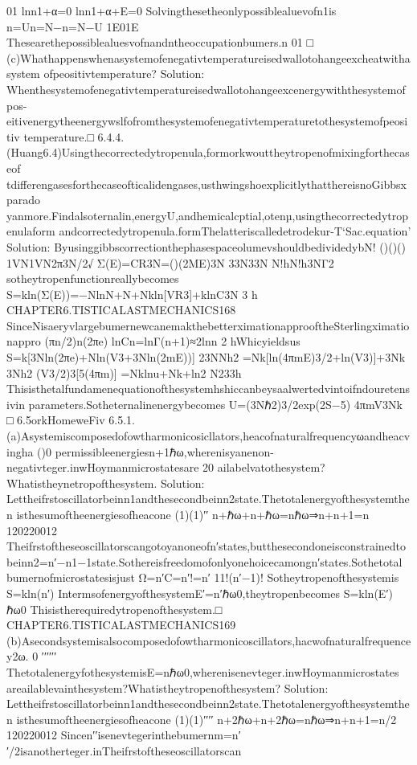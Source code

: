 {{{{{{{{{{01
lnn1+α=0
lnn1+α+E=0
Solvingthesetheonlypossiblealuevofn1is
n=Un=N−n=N−U
1E01E
Thesearethepossiblealuesvofnandntheoccupationbumers.n
01
□
(c)Whathappenswhenasystemofenegativtemperatureisedwallotohangeexcheatwithasystem
ofpeositivtemperature?
Solution:
Whenthesystemofenegativtemperatureisedwallotohangeexcenergywiththesystemofpos-
eitivenergytheenergywslfofromthesystemofenegativtemperaturetothesystemofpeositiv
temperature.□
6.4.4.(Huang6.4)Usingthecorrectedytropenula,formorkwouttheytropenofmixingforthecaseof
tdifferengasesforthecaseofticalidengases,usthwingshoexplicitlythatthereisnoGibbsxparado
yanmore.Findalsoternalin,energyU,andhemicalcptial,otenµ,usingthecorrectedytropenulaform
andcorrectedytropenula.formThelatteriscalledetrodekur-T‘Sac.equation’
Solution:
ByusinggibbscorrectionthephasespaceolumevshouldbedividedybN!
()()()
1VN1VN2π3N/2√
Σ(E)=CR3N=()(2ME)3N
33N33N
N!hN!h3NΓ2
sotheytropenfunctionreallybecomes
S=kln(Σ(E))=−NlnN+N+Nkln[VR3]+klnC3N
3
h
CHAPTER6.TISTICALASTMECHANICS168
SinceNisaeryvlargebumernewcanemakthebetterximationapprooftheSterlingximationappro
(πn/2)n(2πe)
lnCn=lnΓ(n+1)≈2lnn
2
hWhicyieldsus
S=k[3Nln(2πe)+Nln(V3+3Nln(2mE))]
23NNh2
=Nk[ln(4πmE)3/2+ln(V3)]+3Nk
3Nh2
(V3/2)3[5(4πm)]
=Nklnu+Nk+ln2
N233h
Thisisthetalfundamenequationofthesystemhshiccanbeysaalwertedvintoifndouretensivin
parameters.Sotheternalinenergybecomes
U=(3Nℏ2)3/2exp(2S−5)
4πmV3Nk
□
6.5orkHomeweFiv
6.5.1.(a)Asystemiscomposedofowtharmonicosicllators,heacofnaturalfrequencyωandheacvingha
()0
permissibleenergiesn+1ℏω,wherenisyanenon-negativteger.inwHoymanmicrostatesare
20
ailabelvatothesystem?Whatistheynetropofthesystem.
Solution:
Lettheifrstoscillatorbeinn1andthesecondbeinn2state.Thetotalenergyofthesystemthen
isthesumoftheenergiesofheacone
(1)(1)′′
n+ℏω+n+ℏω=nℏω⇒n+n+1=n
120220012
Theifrstoftheseoscillatorscangotoyanoneofn′states,butthesecondoneisconstrainedto
beinn2=n′−n1−1state.Sothereisfreedomofonlyonehoicecamongn′states.Sothetotal
bumernofmicrostatesisjust
Ω=n′C=n′!=n′
11!(n′−1)!
Sotheytropenofthesystemis
S=kln(n′)
IntermsofenergyofthesystemE′=n′ℏω0,theytropenbecomes
S=kln(E′)
ℏω0
Thisistherequiredytropenofthesystem.□
CHAPTER6.TISTICALASTMECHANICS169
(b)Asecondsystemisalsocomposedofowtharmonicoscillators,hacwofnaturalfrequencey2ω.
0
′′′′′′
ThetotalenergyfothesystemisE=nℏω0,wherenisenevteger.inwHoymanmicrostates
areailablevainthesystem?Whatistheytropenofthesystem?
Solution:
Lettheifrstoscillatorbeinn1andthesecondbeinn2state.Thetotalenergyofthesystemthen
isthesumoftheenergiesofheacone
(1)(1)′′′′
n+2ℏω+n+2ℏω=nℏω⇒n+n+1=n/2
120220012
Sincen′′isenevtegerinthebumernm=n′′/2isanotherteger.inTheifrstoftheseoscillatorscan
}}}}}}}}}}
